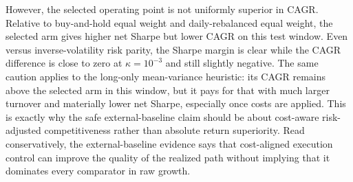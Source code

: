 \documentclass[10pt,twocolumn]{article}
\begin{document}
However, the selected operating point is not uniformly superior in CAGR. Relative to buy-and-hold equal weight and daily-rebalanced equal weight, the selected arm gives higher net Sharpe but lower CAGR on this test window. Even versus inverse-volatility risk parity, the Sharpe margin is clear while the CAGR difference is close to zero at $\kappa=10^{-3}$ and still slightly negative. The same caution applies to the long-only mean-variance heuristic: its CAGR remains above the selected arm in this window, but it pays for that with much larger turnover and materially lower net Sharpe, especially once costs are applied. This is exactly why the safe external-baseline claim should be about cost-aware risk-adjusted competitiveness rather than absolute return superiority. Read conservatively, the external-baseline evidence says that cost-aligned execution control can improve the quality of the realized path without implying that it dominates every comparator in raw growth.
\end{document}
